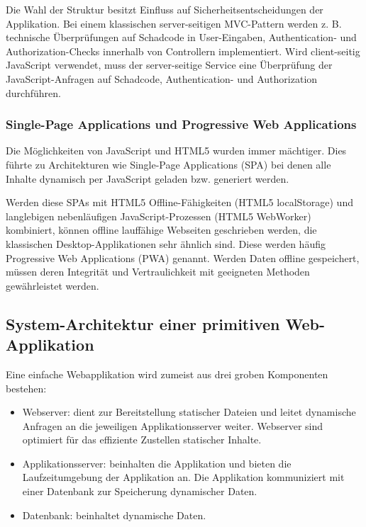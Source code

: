 Die Wahl der Struktur besitzt Einfluss auf Sicherheitsentscheidungen der Applikation. Bei einem klassischen server-seitigen MVC-Pattern werden z. B. technische Überprüfungen auf Schadcode in User-Eingaben, Authentication- und Authorization-Checks innerhalb von Controllern implementiert. Wird client-seitig JavaScript verwendet, muss der server-seitige Service eine Überprüfung der JavaScript-Anfragen auf Schadcode, Authentication- und Authorization durchführen.

\subsubsection{Single-Page Applications und Progressive Web Applications}

Die Möglichkeiten von JavaScript und HTML5 wurden immer mächtiger. Dies führte zu Architekturen wie Single-Page Applications (SPA) bei denen alle Inhalte dynamisch per JavaScript geladen bzw. generiert werden.

Werden diese SPAs mit HTML5 Offline-Fähigkeiten (HTML5 localStorage) und langlebigen nebenläufigen JavaScript-Prozessen (HTML5 WebWorker) kombiniert, können offline lauffähige Webseiten geschrieben werden, die klassischen Desktop-Applikationen  sehr ähnlich sind. Diese werden häufig Progressive Web Applications (PWA) genannt. Werden Daten offline gespeichert, müssen deren Integrität und Vertraulichkeit mit geeigneten Methoden gewährleistet werden.

\subsection{System-Architektur einer primitiven Web-Applikation}

Eine einfache Webapplikation wird zumeist aus drei groben Komponenten bestehen:

\begin{itemize}
	\item Webserver: dient zur Bereitstellung statischer Dateien und leitet dynamische Anfragen an die jeweiligen Applikationsserver weiter. Webserver sind optimiert für das effiziente Zustellen statischer Inhalte.
	\item Applikationsserver: beinhalten die Applikation und bieten die Laufzeitumgebung der Applikation an. Die Applikation kommuniziert mit einer Datenbank zur Speicherung dynamischer Daten.
	\item Datenbank: beinhaltet dynamische Daten.
\end{itemize}

